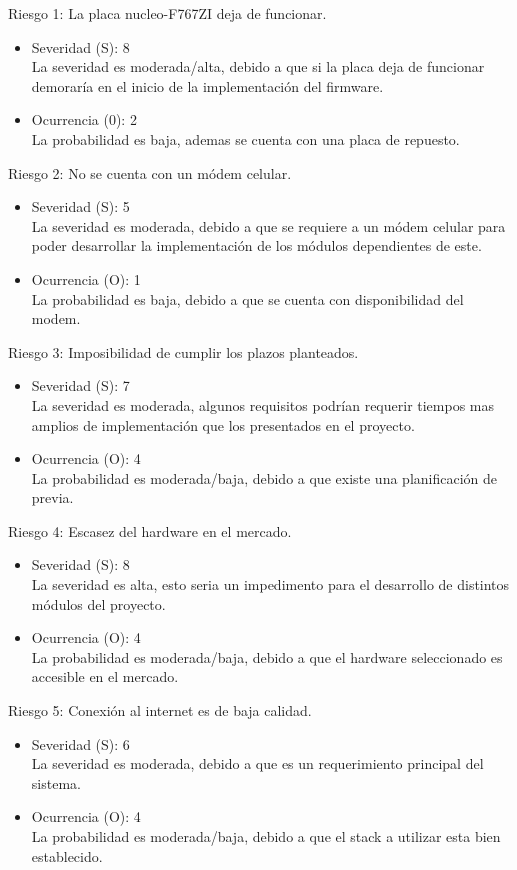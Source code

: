 \documentclass[
11pt, %
]{charter}
\begin{document}
Riesgo 1: La placa nucleo-F767ZI deja de funcionar.
\begin{itemize}
	\item Severidad (S): 8\\
	La severidad es moderada/alta, debido a que si la placa deja de funcionar demoraría en el inicio de la implementación del firmware.
	\item Ocurrencia (0): 2\\
	 La probabilidad es baja, ademas se cuenta con una placa de repuesto. 
\end{itemize}   
Riesgo 2: No se cuenta con un módem celular. 
\begin{itemize}
	\item Severidad (S): 5 \\
	La severidad es moderada, debido a que se requiere a un módem celular para poder desarrollar la implementación de los módulos dependientes de este.
	\item Ocurrencia (O): 1 \\
	La probabilidad es baja, debido a que se cuenta con disponibilidad del modem.
\end{itemize}

Riesgo 3: Imposibilidad de cumplir los plazos planteados.
\begin{itemize}
	\item Severidad (S): 7 \\
	La severidad es moderada, algunos requisitos podrían requerir tiempos mas amplios de implementación que los presentados en el proyecto.
	\item Ocurrencia (O): 4 \\
	La probabilidad es moderada/baja, debido a que existe una planificación de previa.
\end{itemize}

Riesgo 4: Escasez del hardware en el mercado.
\begin{itemize}
	\item Severidad (S): 8 \\
	La severidad es alta, esto seria un impedimento para el desarrollo de distintos módulos del proyecto.
	\item Ocurrencia (O): 4 \\
	La probabilidad es moderada/baja, debido a que el hardware seleccionado es accesible en el mercado.
\end{itemize}

Riesgo 5: Conexión al internet es de baja calidad.
\begin{itemize}
	\item Severidad (S): 6 \\
	La severidad es moderada, debido a que es un requerimiento principal del sistema.
	\item Ocurrencia (O): 4 \\
	La probabilidad es moderada/baja, debido a que el stack a utilizar esta bien establecido.
\end{itemize}
\end{document}
